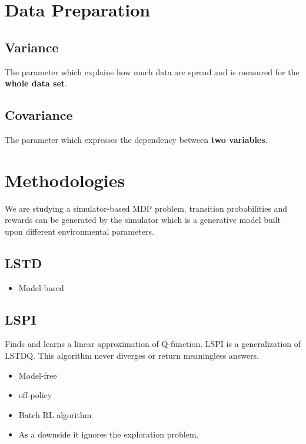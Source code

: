 \documentclass[letterpaper,12pt]{article}
\begin{document}
\section{Data Preparation}

\subsection{Variance}
The parameter which explains how much data are spread and is measured for the \textbf{whole data set}.

\subsection{Covariance}
The parameter which expresses the dependency between \textbf{two variables}.

\section{Methodologies}
We are studying a simulator-based MDP problem. transition probabilities and rewards can be generated by the simulator which is a generative model built upon different environmental parameters.

\subsection{LSTD}
\begin{itemize}
    \item Model-based \cite{Boyan1998}
\end{itemize}

\subsection{LSPI}
Finds and learns a linear approximation of Q-function. LSPI is a generalization of LSTDQ. This algorithm never diverges or return meaningless answers.

\begin{itemize}
    \item Model-free \cite{Lagoudakis2003}
    \item off-policy
    \item Batch RL algorithm
    \item As a downside it ignores the exploration problem.
\end{itemize}
\end{document}
